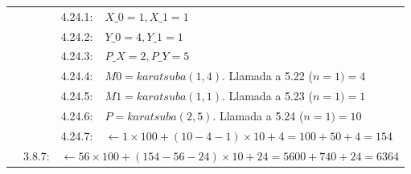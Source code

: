 \documentclass[titlepage,a4paper]{article}
\begin{document}
\begin{longtable}[r]{lllllll}
\multicolumn{4}{l}{}     & 4.24.1:     & \multicolumn{2}{l}{$X\_0=1, X\_1=1$}     \\
\multicolumn{4}{l}{}     & 4.24.2:     & \multicolumn{2}{l}{$Y\_0=4, Y\_1=1$}     \\
\multicolumn{4}{l}{}     & 4.24.3:     & \multicolumn{2}{l}{$P\_X=2, P\_Y=5$}     \\
\multicolumn{4}{l}{}     & 4.24.4:     & \multicolumn{2}{l}{$M0=karatsuba(1,4)$. Llamada a 5.22 ($n=1) = \boxed{4}$}     \\
\multicolumn{4}{l}{}     & 4.24.5:     & \multicolumn{2}{l}{$M1=karatsuba(1,1)$. Llamada a 5.23 ($n=1) = \boxed{1}$}     \\
\multicolumn{4}{l}{}     & 4.24.6:     & \multicolumn{2}{l}{$P=karatsuba(2,5)$. Llamada a 5.24 ($n=1) = \boxed{10}$}     \\
\multicolumn{4}{l}{}     & 4.24.7:     & \multicolumn{2}{l}{$\leftarrow 1\times 100 + (10-4-1)\times 10 + 4 =  100 + 50 + 4 = \boxed{154}$}     \\
\multicolumn{3}{l}{}     & 3.8.7:     & \multicolumn{3}{l}{$\leftarrow 56\times 100 + (154-56-24)\times 10 + 24 =  5600 + 740 + 24 = \boxed{6364}$}     \\


\end{longtable}
\end{document}
